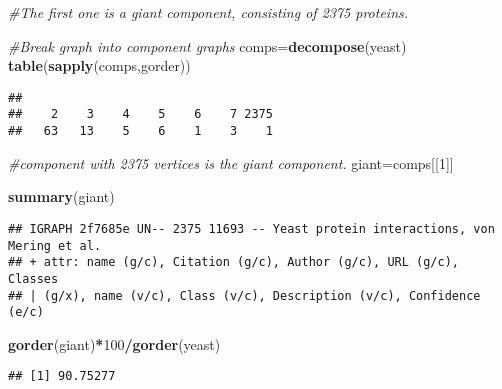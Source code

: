 \documentclass[
]{article}
\newenvironment{Shaded}{\begin{snugshade}}{\end{snugshade}}
\newcommand{\CommentTok}[1]{\textcolor[rgb]{0.56,0.35,0.01}{\textit{#1}}}
\newcommand{\DecValTok}[1]{\textcolor[rgb]{0.00,0.00,0.81}{#1}}
\newcommand{\KeywordTok}[1]{\textcolor[rgb]{0.13,0.29,0.53}{\textbf{#1}}}
\newcommand{\NormalTok}[1]{#1}
\newcommand{\OperatorTok}[1]{\textcolor[rgb]{0.81,0.36,0.00}{\textbf{#1}}}
\begin{document}
\begin{Shaded}
\begin{Highlighting}[]
\CommentTok{#The first one is a giant component, consisting of 2375 proteins.}

\CommentTok{#Break graph into component graphs}
\NormalTok{comps=}\KeywordTok{decompose}\NormalTok{(yeast)}
\KeywordTok{table}\NormalTok{(}\KeywordTok{sapply}\NormalTok{(comps,gorder))}
\end{Highlighting}
\end{Shaded}

\begin{verbatim}
## 
##    2    3    4    5    6    7 2375 
##   63   13    5    6    1    3    1
\end{verbatim}

\begin{Shaded}
\begin{Highlighting}[]
\CommentTok{#component with 2375 vertices is the giant component.}
\NormalTok{giant=comps[[}\DecValTok{1}\NormalTok{]]}

\KeywordTok{summary}\NormalTok{(giant)}
\end{Highlighting}
\end{Shaded}

\begin{verbatim}
## IGRAPH 2f7685e UN-- 2375 11693 -- Yeast protein interactions, von Mering et al.
## + attr: name (g/c), Citation (g/c), Author (g/c), URL (g/c), Classes
## | (g/x), name (v/c), Class (v/c), Description (v/c), Confidence (e/c)
\end{verbatim}

\begin{Shaded}
\begin{Highlighting}[]
\KeywordTok{gorder}\NormalTok{(giant)}\OperatorTok{*}\DecValTok{100}\OperatorTok{/}\KeywordTok{gorder}\NormalTok{(yeast)}
\end{Highlighting}
\end{Shaded}

\begin{verbatim}
## [1] 90.75277
\end{verbatim}

\begin{Shaded}
\end{Shaded}
\end{document}
